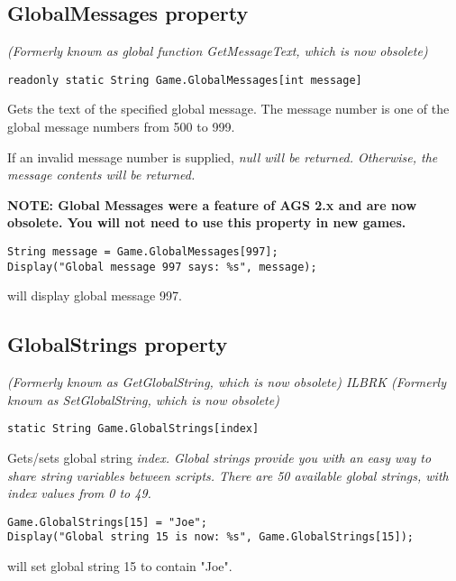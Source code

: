 \subsection{GlobalMessages property}\label{Game.GlobalMessages}%

\it{(Formerly known as global function GetMessageText, which is now obsolete)}

\begin{verbatim}
readonly static String Game.GlobalMessages[int message]
\end{verbatim}
Gets the text of the specified global message. The message number is one of the global
message numbers from 500 to 999.

If an invalid message number is supplied, \it{null} will be returned. Otherwise, the
message contents will be returned.

\bf{NOTE:} Global Messages were a feature of AGS 2.x and are now obsolete. You will not
need to use this property in new games.

\begin{verbatim}
String message = Game.GlobalMessages[997];
Display("Global message 997 says: %s", message);
\end{verbatim}
will display global message 997.


\subsection{GlobalStrings property}\label{Game.GlobalStrings}%

\it{(Formerly known as GetGlobalString, which is now obsolete)} ILBRK
\it{(Formerly known as SetGlobalString, which is now obsolete)}

\begin{verbatim}
static String Game.GlobalStrings[index]
\end{verbatim}
Gets/sets global string \it{index}. Global strings provide you with an easy way to share
string variables between scripts. There are 50 available global strings, with \it{index}
values from 0 to 49.

\begin{verbatim}
Game.GlobalStrings[15] = "Joe";
Display("Global string 15 is now: %s", Game.GlobalStrings[15]);
\end{verbatim}
will set global string 15 to contain "Joe".

